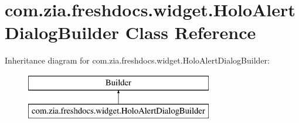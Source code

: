 \hypertarget{classcom_1_1zia_1_1freshdocs_1_1widget_1_1_holo_alert_dialog_builder}{\section{com.\-zia.\-freshdocs.\-widget.\-Holo\-Alert\-Dialog\-Builder Class Reference}
\label{classcom_1_1zia_1_1freshdocs_1_1widget_1_1_holo_alert_dialog_builder}
}
Inheritance diagram for com.\-zia.\-freshdocs.\-widget.\-Holo\-Alert\-Dialog\-Builder\-:\begin{figure}[H]
\begin{center}
\leavevmode
\includegraphics[height=2.000000cm]{classcom_1_1zia_1_1freshdocs_1_1widget_1_1_holo_alert_dialog_builder}
\end{center}
\end{figure}

